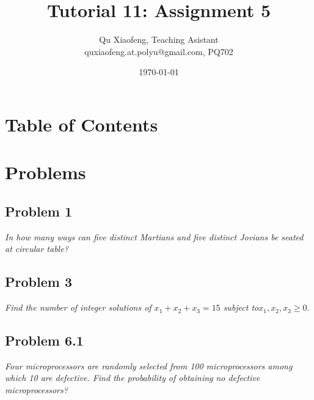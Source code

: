 \documentclass[
        ]{beamer}
\title[Tutorial 11]{Tutorial 11: Assignment 5}
\author[COMP210]{Qu Xiaofeng\texorpdfstring{, Teaching Asistant\\\tiny{quxiaofeng.at.polyu@gmail.com, PQ702}}{}}
\institute{COMP210\\Discrete Structure}
\date{\today}
\begin{document}
\frame{\titlepage}

\section*{Table of Contents}

    \begin{frame}[shrink]{\secname}
        \tableofcontents
    \end{frame}




\section{Problems}
    \subsection{Problem 1}    
        \begin{frame}[c]{\subsecname}
            \emph{In how many ways can five distinct Martians and five distinct Jovians be seated at circular table?}\\\pause
        \end{frame}



    \subsection{Problem 3}
        \begin{frame}[c]{\subsecname}
            \emph{Find the number of integer solutions of $x_1 + x_2 + x_3 = 15$ subject to$ x_1, x_2, x_3 \geq 0$.}\\\pause
        \end{frame}



    \subsection{Problem 6.1}
        \begin{frame}[c]{\subsecname}
            \emph{Four microprocessors are randomly selected from 100 microprocessors among
which 10 are defective. Find the probability of obtaining no defective microprocessors?}\\\pause
        \end{frame}
\end{document}
